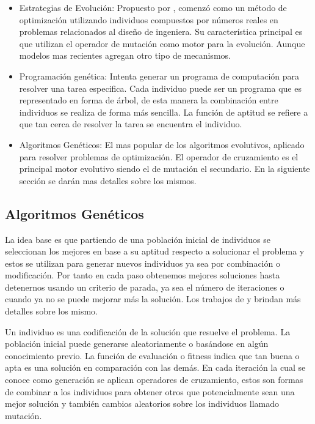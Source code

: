 \begin{itemize}

	\item Estrategias de Evolución: Propuesto por \citet{Ingo1971}, comenzó como un método de optimización utilizando individuos compuestos por números reales en problemas relacionados al diseño de ingeniera. Su característica principal es que utilizan el operador de mutación como motor para la evolución. Aunque modelos mas recientes agregan otro tipo de mecanismos.
	\item Programación genética: Intenta generar un programa de computación para resolver una tarea especifica. Cada individuo puede ser un programa que es representado en forma de árbol, de esta manera la combinación entre individuos se realiza de forma más sencilla. La función de aptitud se refiere a que tan cerca de resolver la tarea se encuentra el individuo.\citep{Koza1992}
	\item Algoritmos Genéticos: El mas popular de los algoritmos evolutivos, aplicado para resolver problemas de optimización. El operador de cruzamiento es el principal motor evolutivo siendo el de mutación el secundario. En la siguiente sección se darán mas detalles sobre los mismos.
\end{itemize}




\subsection{Algoritmos Genéticos}

La idea base es que partiendo de una población inicial de individuos se seleccionan los mejores en base a su aptitud respecto a solucionar el problema y estos se utilizan para generar nuevos individuos ya sea por combinación o modificación. Por tanto en cada paso obtenemos mejores soluciones hasta detenernos usando un criterio de parada, ya sea el número de iteraciones o cuando ya no se puede mejorar más la solución. Los trabajos de \citet{Goldberg1989} y \citet{Mitchell1996} brindan más detalles sobre los mismo.

Un individuo es una codificación de la solución que resuelve el problema. La población inicial puede generarse aleatoriamente o basándose en algún conocimiento previo. La función de evaluación o fitness indica que tan buena o apta es una solución en comparación con las demás.
En cada iteración la cual se conoce como generación se aplican operadores de cruzamiento, estos son formas de combinar a los individuos para obtener otros que potencialmente sean una mejor solución y también cambios aleatorios sobre los individuos llamado mutación.


